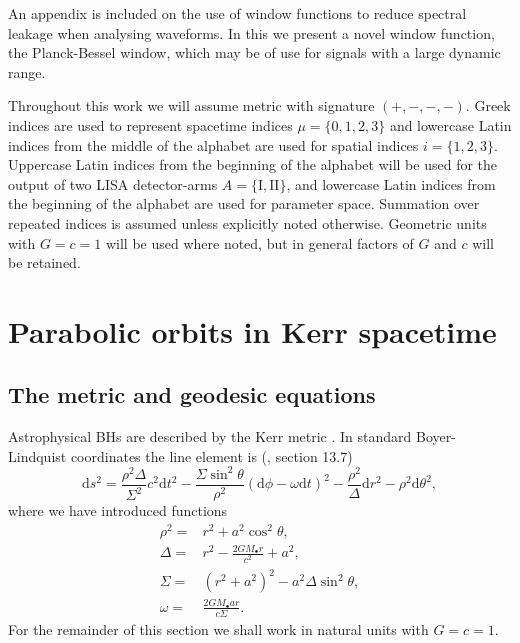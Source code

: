 \documentclass[useAMS,usedcolumn,usegraphicx,usenatbib]{mn2e}
\newcommand{\dd}{\ensuremath{\mathrm{d}}}
\begin{document}
An appendix is included on the use of window functions to reduce spectral leakage when analysing waveforms. In this we present a novel window function, the Planck-Bessel window, which may be of use for signals with a large dynamic range.

Throughout this work we will assume metric with signature $(+,-,-,-)$. Greek indices are used to represent spacetime indices $\mu = \{0,1,2,3\}$ and lowercase Latin indices from the middle of the alphabet are used for spatial indices $i = \{1,2,3\}$. Uppercase Latin indices from the beginning of the alphabet will be used for the output of two LISA detector-arms $A = \{\mathrm{I}, \mathrm{II}\}$, and lowercase Latin indices from the beginning of the alphabet are used for parameter space. Summation over repeated indices is assumed unless explicitly noted otherwise. Geometric units with $G = c = 1$ will be used where noted, but in general factors of $G$ and $c$ will be retained.

\section{Parabolic orbits in Kerr spacetime}\label{sec:Geodesic}

\subsection{The metric and geodesic equations}

Astrophysical BHs are described by the Kerr metric \citep{Kerr1963}. In standard Boyer-Lindquist coordinates the line element is (\citealt*{Boyer1967, Hobson2006}, section 13.7)
\begin{equation}
\dd s^2 = \frac{\rho^2 \Delta}{\Sigma^2}c^2\dd t^2 - \frac{\Sigma \sin^2 \theta}{\rho^2}\left(\dd \phi - \omega \dd t\right)^2 - \frac{\rho^2}{\Delta}\dd r^2 - \rho^2\dd \theta^2,
\end{equation}
where we have introduced functions
\begin{align}
\rho^2 = {} & r^2 + a^2\cos^2\theta,\\
\Delta = {} & r^2 - \frac{2GM_\bullet r}{c^2} + a^2,\\
\Sigma = {} & \left(r^2 +a^2\right)^2 - a^2\Delta\sin^2\theta,\\
\omega = {} & \frac{2GM_\bullet ar}{c\Sigma}.
\end{align}
For the remainder of this section we shall work in natural units with $G = c = 1$.
\end{document}
